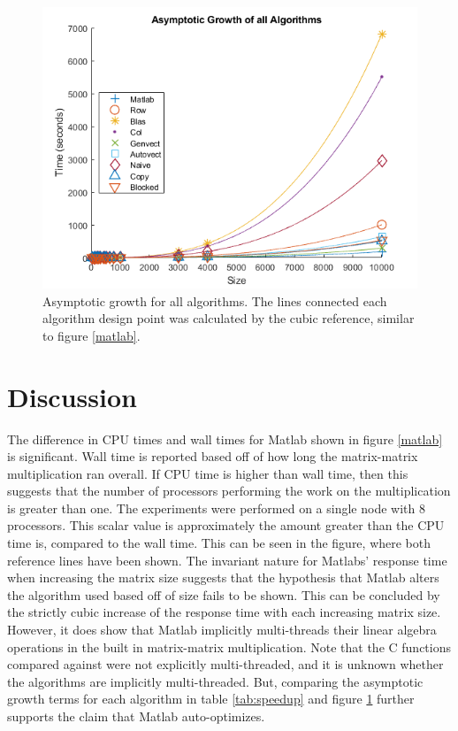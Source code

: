 \documentclass[sigconf]{acmart}
\begin{document}
\begin{figure}[b]
  \centering
  \includegraphics[width=\linewidth]{graphs/all.png}
  \caption{Asymptotic growth for all algorithms. The lines connected each algorithm design point was calculated by the cubic reference, similar to figure \ref{matlab}.}
  \Description{}
  \label{all}
\end{figure}

\section{Discussion}

The difference in CPU times and wall times for Matlab shown in figure \ref{matlab} is significant. Wall time is reported based off of how long the matrix-matrix multiplication ran overall. If CPU time is higher than wall time, then this suggests that the number of processors performing the work on the multiplication is greater than one. The experiments were performed on a single node with 8 processors. This scalar value is approximately the amount greater than the CPU time is, compared to the wall time. This can be seen in the figure, where both reference lines have been shown. The invariant nature for Matlabs' response time when increasing the matrix size suggests that the hypothesis that Matlab alters the algorithm used based off of size fails to be shown. This can be concluded by the strictly cubic increase of the response time with each increasing matrix size. However, it does show that Matlab implicitly multi-threads their linear algebra operations in the built in matrix-matrix multiplication. Note that the C functions compared against were not explicitly multi-threaded, and it is unknown whether the algorithms are implicitly multi-threaded. But, comparing the asymptotic growth terms for each algorithm in table \ref{tab:speedup} and figure \ref{all} further supports the claim that Matlab auto-optimizes.
\end{document}

